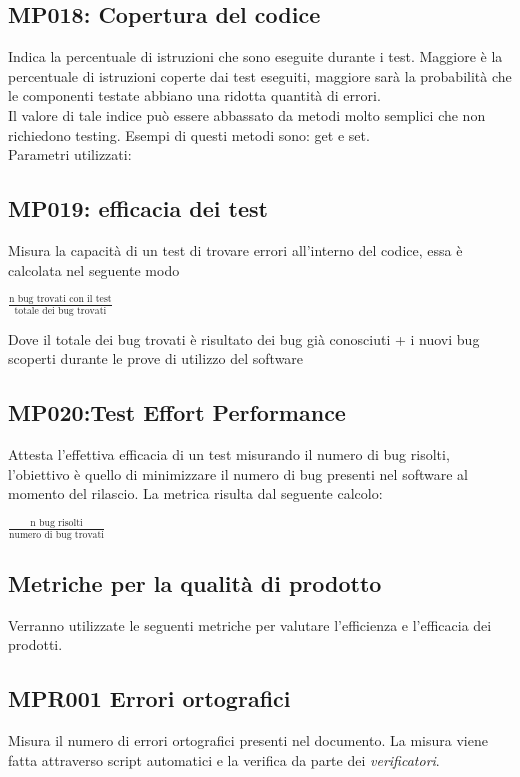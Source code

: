 \subsection{MP018: Copertura del codice}
Indica la percentuale di istruzioni che sono eseguite durante i test.
Maggiore è la percentuale di istruzioni coperte dai test eseguiti, maggiore sarà la probabilità che le componenti testate abbiano una ridotta quantità di errori.\\
Il valore di tale indice può essere abbassato da metodi molto semplici che non richiedono testing. Esempi di questi metodi sono: get e set.\\
Parametri utilizzati:

\subsection{MP019: efficacia dei test}
Misura la capacità di un test di trovare errori all'interno del codice, essa è calcolata nel seguente modo
\begin{center}
	\vspace{1em}
	$\frac{\mbox{n bug trovati con il test}}{\mbox{totale dei bug trovati}}$\\
\end{center}
\vspace{1em}
Dove il totale dei bug trovati è risultato dei bug già conosciuti + i nuovi bug scoperti durante le prove di utilizzo del software

\subsection{MP020:Test Effort Performance}
Attesta l'effettiva efficacia di un test misurando il numero di bug risolti, l'obiettivo è quello di minimizzare il numero di bug presenti nel software al momento del rilascio.
La metrica risulta dal seguente calcolo:
\begin{center}
\vspace{1em}
$\frac{\mbox{n bug risolti}}{\mbox{numero di bug trovati}}$

\end{center}
\subsection{Metriche per la qualità di prodotto}
Verranno utilizzate le seguenti metriche per valutare l'efficienza e l'efficacia dei
prodotti.
\subsection{MPR001 Errori ortografici}
Misura il numero di errori ortografici presenti nel documento. La misura viene fatta attraverso script automatici e la verifica da parte dei \textit{verificatori}.

